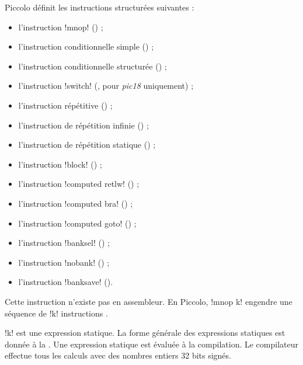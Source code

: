 Piccolo définit les instructions structurées suivantes :
\begin{itemize}
  \item l'instruction \pic!mnop! () ;
  \item l'instruction conditionnelle simple () ;
  \item l'instruction conditionnelle structurée () ;
  \item l'instruction \pic!switch! (, pour \emph{pic18} uniquement) ;
  \item l'instruction répétitive () ;
  \item l'instruction de répétition infinie () ;
  \item l'instruction de répétition statique () ;
  \item l'instruction \pic!block! () ;
  \item l'instruction \pic!computed retlw! () ;
  \item l'instruction \pic!computed bra! () ;
  \item l'instruction \pic!computed goto! () ;
  \item l'instruction \pic!banksel! () ;
  \item l'instruction \pic!nobank! () ;
  \item l'instruction \pic!banksave! ().
\end{itemize}


Cette instruction n'existe pas en assembleur. En Piccolo, \pic!mnop k! engendre une séquence de \pic!k! instructions .

\pic!k! est une expression statique. La forme générale des expressions statiques est donnée à la . Une expression statique est évaluée à la compilation. Le compilateur effectue tous les calculs avec des nombres entiers 32 bits signés.





